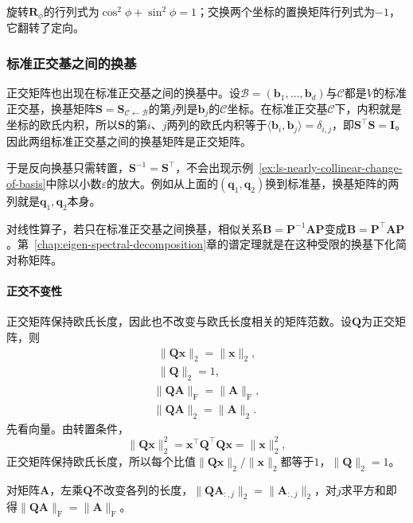 旋转$\bm R_\phi$的行列式为$\cos^2\phi+\sin^2\phi=1$；交换两个坐标的置换矩阵行列式为$-1$，它翻转了定向。

\subsubsection{标准正交基之间的换基}
\label{sec:ls-orthonormal-change-of-basis}
正交矩阵也出现在标准正交基之间的换基中。设$\mathcal B=(\bm b_1,\ldots,\bm b_d)$与$\mathcal C$都是$V$的标准正交基，换基矩阵$\bm S=\bm S_{\mathcal C\leftarrow\mathcal B}$的第$j$列是$\bm b_j$的$\mathcal C$坐标。在标准正交基$\mathcal C$下，内积就是坐标的欧氏内积，所以$\bm S$的第$i$、$j$两列的欧氏内积等于$\langle\bm b_i,\bm b_j\rangle=\delta_{i,j}$，即$\bm S^\top\bm S=\bm I$。因此两组标准正交基之间的换基矩阵是正交矩阵。

于是反向换基只需转置，$\bm S^{-1}=\bm S^\top$，不会出现示例~\ref{ex:ls-nearly-collinear-change-of-basis}中除以小数$\varepsilon$的放大。例如从上面的$(\bm q_1,\bm q_2)$换到标准基，换基矩阵的两列就是$\bm q_1,\bm q_2$本身。

对线性算子，若只在标准正交基之间换基，相似关系$\bm B=\bm P^{-1}\bm A\bm P$变成$\bm B=\bm P^\top\bm A\bm P$。第~\ref{chap:eigen-spectral-decomposition}章的谱定理就是在这种受限的换基下化简对称矩阵。

\paragraph{正交不变性}
正交矩阵保持欧氏长度，因此也不改变与欧氏长度相关的矩阵范数。设$\bm Q$为正交矩阵，则
\[
 \begin{gathered}
 \lVert\bm Q\bm x\rVert_2=\lVert\bm x\rVert_2,\\
 \lVert\bm Q\rVert_2=1,
 \end{gathered}
\]
\[
 \begin{gathered}
 \lVert\bm Q\bm A\rVert_{\mathrm F}=\lVert\bm A\rVert_{\mathrm F},\\
 \lVert\bm Q\bm A\rVert_2=\lVert\bm A\rVert_2.
 \end{gathered}
\]
先看向量。由转置条件，
\[
 \lVert\bm Q\bm x\rVert_2^2=\bm x^\top\bm Q^\top\bm Q\bm x=\lVert\bm x\rVert_2^2,
\]
正交矩阵保持欧氏长度，所以每个比值$\lVert\bm Q\bm x\rVert_2/\lVert\bm x\rVert_2$都等于$1$，$\lVert\bm Q\rVert_2=1$。

对矩阵$\bm A$，左乘$\bm Q$不改变各列的长度，$\lVert\bm Q\bm A_{:,j}\rVert_2=\lVert\bm A_{:,j}\rVert_2$，对$j$求平方和即得$\lVert\bm Q\bm A\rVert_{\mathrm F}=\lVert\bm A\rVert_{\mathrm F}$。

